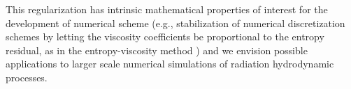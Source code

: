 \documentclass{mc2015}
\begin{document}
This regularization has intrinsic mathematical properties of interest for the development of numerical scheme
(e.g., stabilization of numerical discretization schemes by letting the viscosity coefficients be proportional 
to the entropy residual, as in the entropy-viscosity method \cite{jlg1})
and we envision possible applications to larger scale numerical simulations of radiation hydrodynamic processes.

\setlength{\baselineskip}{12pt}



\end{document}
